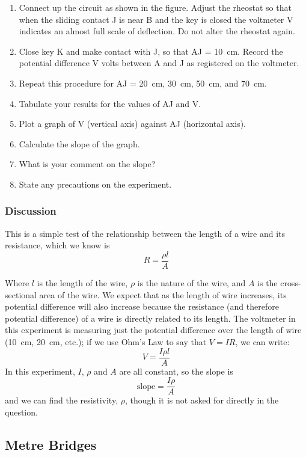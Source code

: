 
\begin{enumerate}
\item{Connect up the circuit as shown in the figure. Adjust the rheostat so that when the sliding
contact J is near B and the key is closed the voltmeter V indicates an almost full scale
of deflection. Do not alter the rheostat again.}
\item{Close key K and make contact with J, so that AJ = 10~cm. Record the potential
difference V volts between A and J as registered on the voltmeter.}
\item{Repeat this procedure for AJ = 20~cm, 30~cm, 50~cm, and 70~cm.}
\item{Tabulate your results for the values of AJ and V.}
\item{Plot a graph of V (vertical axis) against AJ (horizontal axis).}
\item{Calculate the slope of the graph.}
\item{What is your comment on the slope?}
\item{State any precautions on the experiment.}
\end{enumerate}

\subsubsection{Discussion}

This is a simple test of the relationship between the length of a wire and its
resistance, which we know is $$R=\frac{\rho l}{A} $$

Where $l$ is the length of the wire, $\rho$ is the nature of the wire, and $A$ is the cross-sectional
area of the wire. We expect that as the length of wire increases, its potential difference
will also increase because the resistance (and therefore potential difference) of a wire is
directly related to its length. The voltmeter in this experiment is measuring just the
potential difference over the length of wire (10~cm, 20~cm, etc.); if we use Ohm’s Law to say that $V = IR$, we can write:\\
$$ V = \frac{I \rho l}{A} $$
In this experiment, $I$, $\rho$ and $A$ are all constant, so the slope is
$$\mathrm{slope} = \frac{I \rho}{A} $$
and we can find the resistivity, $\rho$, though it is not asked for directly in the question.

\subsection{Metre Bridges}

